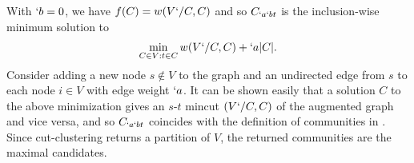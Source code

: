 \begin{Proof}
  With $`b=0$, we have $f(C)=w(V`/C,C)$ and so $C_{`a`bt}$ is the
  inclusion-wise minimum solution to
  \begin{align*}
    \min_{C\in V:t\in C} w(V`/C,C) + `a\lvert C\rvert.
  \end{align*}
  Consider adding a new node $s\not\in V$ to the graph and an
  undirected edge from $s$ to each node $i\in V$ with edge weight
  $`a$. It can be shown easily that a solution $C$ to the above
  minimization gives an $s$-$t$ mincut $(V`/C,C)$ of the augmented graph and
  vice versa, and so $C_{`a`bt}$ coincides with the definition of
  communities in \cite[Lemma~3.1]{flake:cut-clustering}. Since
  cut-clustering returns a partition of $V$, the returned communities
  are the maximal candidates.
  

\end{Proof}



